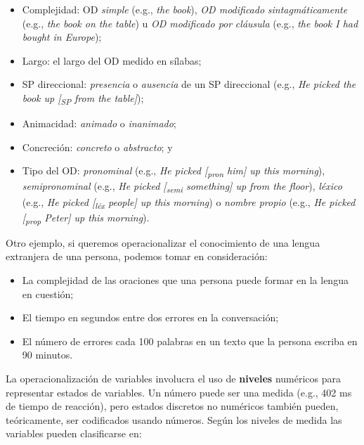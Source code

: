 \documentclass[authoryear,a4paper, 14pt]{scrartcl}
\begin{document}
\begin{itemize}
    \item
      Complejidad: OD \emph{simple} (e.g., \emph{the book}), \emph{OD
      modificado} \emph{sintagmáticamente} (e.g., \emph{the book on the
      table}) u \emph{OD modificado por} \emph{cláusula} (e.g., \emph{the
      book I had bought in Europe});
    \item
      Largo: el largo del OD medido en sílabas;
    \item
      SP direccional: \emph{presencia} o \emph{ausencia} de un SP
      direccional (e.g., \emph{He picked the book up {[}\textsubscript{SP}
      from the table{]}});
    \item
      Animacidad: \emph{animado} o \emph{inanimado};
    \item
      Concreción: \emph{concreto} o \emph{abstracto}; y
    \item
      Tipo del OD: \emph{pronominal} (e.g., \emph{He picked
      {[}\textsubscript{pron} him{]} up this morning}),
      \emph{semipronominal} (e.g., \emph{He picked {[}\textsubscript{semi}
      something{]} up from the floor}), \emph{léxico} (e.g., \emph{He picked
      {[}\textsubscript{léx} people{]} up this morning}) o \emph{nombre
      propio} (e.g., \emph{He picked {[}\textsubscript{prop} Peter{]} up
      this morning}).
\end{itemize}

Otro ejemplo, si queremos operacionalizar el conocimiento de una lengua
extranjera de una persona, podemos tomar en consideración:

\begin{itemize}
    \item
      La complejidad de las oraciones que una persona puede formar en la
      lengua en cuestión;
    \item
      El tiempo en segundos entre dos errores en la conversación;
    \item
      El número de errores cada 100 palabras en un texto que la persona
      escriba en 90 minutos.
\end{itemize}

La operacionalización de variables involucra el uso de \textbf{niveles}
numéricos para representar estados de variables. Un número puede ser una
medida (e.g., 402 ms de tiempo de reacción), pero estados discretos no 
numéricos también pueden, teóricamente, ser codificados usando números. 
Según los niveles de medida las variables pueden clasificarse en:
\end{document}
